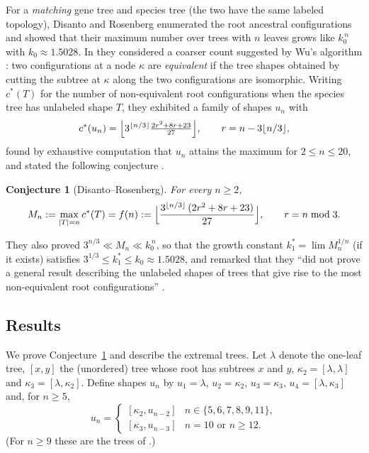 \documentclass[11pt]{amsart}
\newtheorem{conjecture}[theorem]{Conjecture}
\theoremstyle{definition}
\theoremstyle{remark}
\newcommand{\lf}{\lambda}
\newcommand{\cstar}{c^{*}}
\begin{document}
For a \emph{matching} gene tree and species tree (the two have the same labeled topology), Disanto and Rosenberg \cite{DR2017} enumerated the root ancestral configurations and showed that their maximum number over trees with $n$ leaves grows like $k_0^{\,n}$ with $k_0\approx 1.5028$.
In \cite{DR2019} they considered a coarser count suggested by Wu's algorithm \cite{Wu2012}: two configurations at a node $\kappa$ are \emph{equivalent} if the tree shapes obtained by cutting the subtree at $\kappa$ along the two configurations are isomorphic.
Writing $\cstar(T)$ for the number of non-equivalent root configurations when the species tree has unlabeled shape $T$, they exhibited a family of shapes $u_n$ with
\[
\cstar(u_n)=\Bigl\lfloor 3^{\lfloor n/3\rfloor}\tfrac{2r^2+8r+23}{27}\Bigr\rfloor,\qquad r=n-3\lfloor n/3\rfloor,
\]
found by exhaustive computation that $u_n$ attains the maximum for $2\le n\le 20$, and stated the following conjecture \cite[Sect.~4.3, after eq.~(16)]{DR2019}.

\begin{conjecture}[Disanto--Rosenberg]\label{conj:DR}
For every $n\ge 2$,
\[
M_n:=\max_{|T|=n}\cstar(T)=f(n):=\Bigl\lfloor \frac{3^{\lfloor n/3\rfloor}\,(2r^2+8r+23)}{27}\Bigr\rfloor,\qquad r=n\bmod 3 .
\]
\end{conjecture}

They also proved $3^{n/3}\ll M_n\ll k_0^{\,n}$, so that the growth constant $k_1^*=\lim M_n^{1/n}$ (if it exists) satisfies $3^{1/3}\le k_1^*\le k_0\approx 1.5028$, and remarked that they ``did not prove a general result describing the unlabeled shapes of trees that give rise to the most non-equivalent root configurations'' \cite[Sect.~6]{DR2019}.

\subsection*{Results}
We prove Conjecture~\ref{conj:DR} and describe the extremal trees.
Let $\lf$ denote the one-leaf tree, $[x,y]$ the (unordered) tree whose root has subtrees $x$ and $y$, $\kappa_2=[\lf,\lf]$ and $\kappa_3=[\lf,\kappa_2]$.
Define shapes $u_n$ by $u_1=\lf$, $u_2=\kappa_2$, $u_3=\kappa_3$, $u_4=[\lf,\kappa_3]$ and, for $n\ge 5$,
\[
u_n=\begin{cases}[\kappa_2,u_{n-2}] & n\in\{5,6,7,8,9,11\},\\ [\kappa_3,u_{n-3}] & n=10 \text{ or } n\ge 12.\end{cases}
\]
(For $n\ge 9$ these are the trees of \cite[Sect.~3.2 and eq.~(14)]{DR2019}.)
\end{document}
